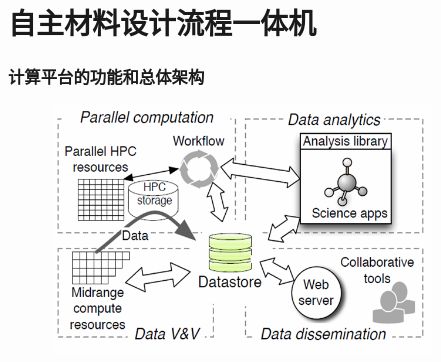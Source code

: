 %
\section{自主材料设计流程一体机}     %

\frame
{
	\frametitle{\textrm{计算平台的功能和总体架构}}
\begin{figure}[h!]
\centering
\vspace*{-0.35in}
\includegraphics[height=2.6in,width=4.05in,viewport=0 0 670 460,clip]{Figures/Parallel_computation.png}
\caption{\fontsize{7.2pt}{4.2pt}}%
\label{Auto_Flow}
\end{figure} 
}

